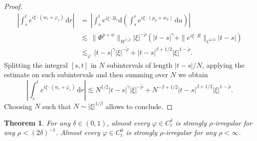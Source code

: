 \documentclass[10pt]{article}
\newcommand{\mathd}{\mathrm{d}}
\newtheorem{theorem}{Theorem}%
\begin{document}
{{\begin{proof}
  \begin{align*}
    \left| \int_s^t e^{i \xi \cdot (w_r + \varphi_r)} \, \mathd r \right| & =
    \, \left| \int_s^t e^{i \xi \cdot R_r} \mathd \left( \int_s^r e^{i \xi
    \cdot (p_u + w_u)} \, \mathd u \right) \right|\\
    & \lesssim \, \| \Phi^{p + w} \|_{\mathcal{W}^{\gamma, \tilde{\rho}}} |
    \xi |^{- \tilde{\rho}} (| t - s |^{\gamma} + \| e^{i \xi \cdot R} \|_{C^{1
    / 2}} | t - s |)\\
    & \lesssim_{\varphi} \, | t - s |^{\gamma} | \xi |^{- \tilde{\rho}} + | t
    - s |^{\beta + 1 / 2} | \xi |^{1 - \tilde{\rho}} .
  \end{align*}
%  
  Splitting the integral $[s, t]$ in $N$ subintervals of length $| t - s | /
  N$, applying the estimate on such subintervals and then summing over $N$ we
  obtain
  \[ \left| \int_s^t e^{i \xi \cdot (w_r + \varphi_r)} \, \mathd r \right|
     \lesssim N^{1 / 2} | t - s |^{\gamma} | \xi |^{- \tilde{\rho}} + N^{-
     \beta + 1 / 2} | t - s |^{\beta + 1 / 2} | \xi |^{1 - \tilde{\rho}} . \]
  Choosing $N$ such that $N \sim | \xi |^{1 / \beta}$ allows to conclude.
\end{proof}}}

\begin{theorem}
  \label{sec5.3 thm prevalence strong rho}For any $\delta \in (0, 1)$, almost
  every $\varphi \in C^{\delta}_t$ is strongly $\rho$-irregular for any $\rho
  < (2 \delta)^{- 1}$. Almost every $\varphi \in C^0_t$ is strongly
  $\rho$-irregular for any $\rho < \infty$.
\end{theorem}
\end{document}
